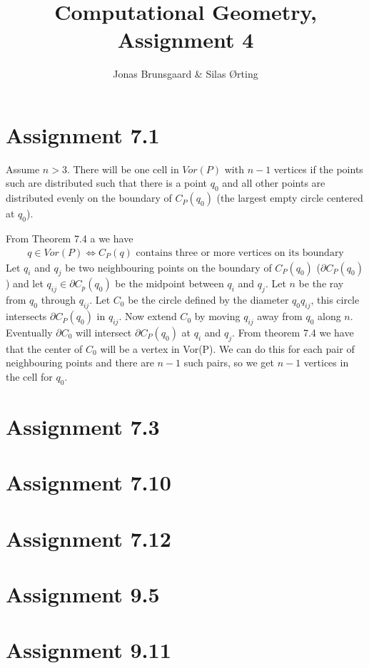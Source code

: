 \documentclass[10pt,a4paper,final,oneside,openany,article,oldfontcommands]{memoir}
\title{Computational Geometry, Assignment 4}
\author{
    Jonas Brunsgaard \& Silas Ørting
}
\begin{document}
\maketitle


\chapter*{Assignment 7.1}
Assume $n > 3$. There will be one cell in $Vor(P)$ with $n-1$ vertices if the points such are distributed such that there is a point $q_0$ and all other points are distributed evenly on the boundary of $C_P(q_0)$ (the largest empty circle centered at $q_0$).

From Theorem 7.4 a we have
\begin{align*}
  q \in Vor(P) \iff C_P(q) \text{ contains three or more vertices on its boundary}
\end{align*}
Let $q_i$ and $q_j$ be two neighbouring points on the boundary of $C_P(q_0)$ ($\partial C_P(q_0)$) and let $q_{ij} \in \partial C_p(q_0)$ be the midpoint between $q_i$ and $q_j$. Let $n$ be the ray from $q_0$ through $q_{ij}$. Let $C_0$ be the circle defined by the diameter $q_0q_{ij}$, this circle intersects $\partial C_P(q_0)$ in $q_{ij}$. Now extend $C_0$ by moving $q_{ij}$ away from $q_0$ along $n$. Eventually $\partial C_0$ will intersect $\partial C_P(q_0)$ at $q_i$ and $q_j$. From theorem 7.4 we have that the center of $C_0$ will be a vertex in Vor(P). We can do this for each pair of neighbouring points and there are $n-1$ such pairs, so we get $n-1$ vertices in the cell for $q_0$.

\chapter*{Assignment 7.3}


\chapter*{Assignment 7.10}


\chapter*{Assignment 7.12}


\chapter*{Assignment 9.5}


\chapter*{Assignment 9.11}

\printbibliography
\end{document}
